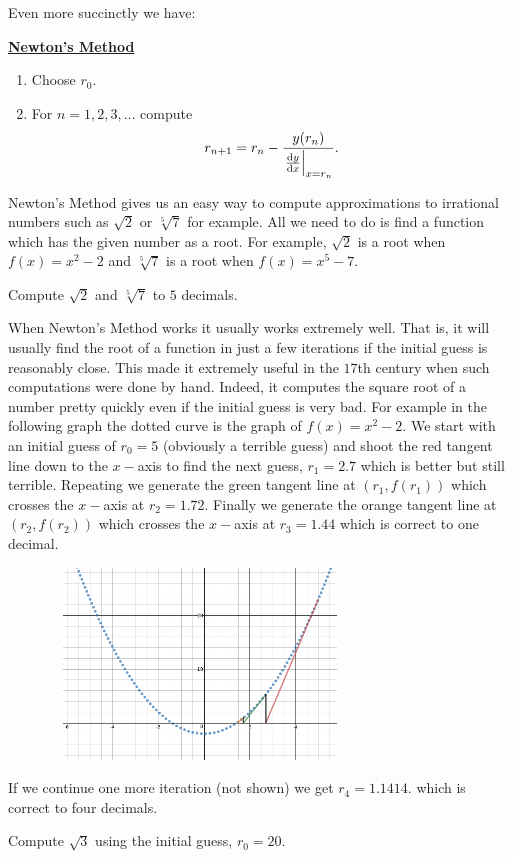 Even more succinctly we have:\\[2mm]
\centerline{\bf \Large \underline{Newton's Method}}
\begin{enumerate}
\item Choose $r_0.$
\item For $n=1, 2, 3, \ldots$ compute
$$
r_{n+1}=r_n-\frac{y(r_n)}{\left.\frac{\text{d}{y}}{\text{d}{x}}\right|_{x=r_n}}.
$$
\end{enumerate}

\begin{myexample}
  Newton's Method gives us an easy way to compute approximations to
  irrational numbers such as $\sqrt{2}$ or $\sqrt[5]{7}$ for
  example. All we need to do is find a function which has the given
  number as a root. For example, $\sqrt{2}$ is a root when $f(x) =
  x^2-2$ and $\sqrt[5]{7}$ is a root when $f(x) = x^5-7.$
\end{myexample}
\begin{embeddedproblem}
  Compute $\sqrt{2}$ and $\sqrt[5]{7}$ to $5$ decimals.
\end{embeddedproblem}

When Newton's Method works it usually works extremely well. That is,
it will usually find the root of a function in just a few iterations
if the initial guess is reasonably close. This made it extremely
useful in the $17$th century when such computations were done by
hand. Indeed, it computes the
square root of a number pretty quickly even if the initial guess is
very bad. For example in the following graph the dotted curve is the
graph of $f(x)=x^2-2.$ We start with an initial guess of $r_0=5$
(obviously a terrible guess) and
shoot the red tangent line down to the $x-$axis to find the next
guess, $r_1=2.7$ which is better but still terrible. Repeating we
generate the green tangent line at $(r_1,f(r_1))$ which crosses the
$x-$axis at $r_2= 1.72.$ Finally we generate the orange tangent line
at $(r_2,f(r_2))$ which crosses the $x-$axis at $r_3=1.44$ which is
correct to one decimal.
\centerline{\includegraphics*[height=2in,width=4in]{Figures/NewtonsMethod1}}
If we continue one more iteration (not shown) we get $r_4=1.1414.$
which is correct to four decimals. 
\begin{embeddedproblem}{}
  Compute $\sqrt{3}$ using the initial guess, $r_0=20.$
\end{embeddedproblem}


